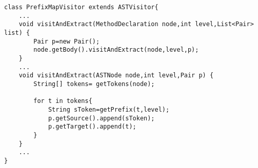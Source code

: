\begin{lstlisting}[basicstyle=\small,caption={Algorithm to extract the source and target sequences by ASTParser in PrefixMap},label={algm001}]
class PrefixMapVisitor extends ASTVisitor{
    ...
	void visitAndExtract(MethodDeclaration node,int level,List<Pair> list) {
	    Pair p=new Pair();
	    node.getBody().visitAndExtract(node,level,p);
	}
	...		
	void visitAndExtract(ASTNode node,int level,Pair p) {
		String[] tokens= getTokens(node);
		
		for t in tokens{
		    String sToken=getPrefix(t,level);
		    p.getSource().append(sToken);
		    p.getTarget().append(t);
        }
	}
	...
}
\end{lstlisting}